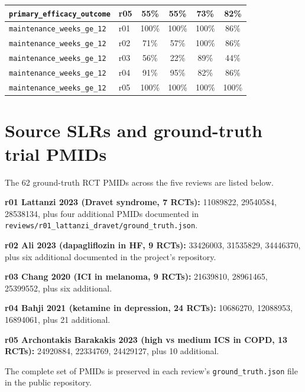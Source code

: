 \documentclass[a4paper,fleqn]{cas-sc}
\begin{document}
\begin{table}[ht]
\begin{tabular*}{\tblwidth}{@{}p{3.6cm}p{0.6cm}cccc@{}}
\texttt{primary\_efficacy\_outcome} & r05 & 55\% & 55\% & 73\% & 82\% \\
\midrule
\texttt{maintenance\_weeks\_ge\_12} & r01 & 100\% & 100\% & 100\% & 86\% \\
\texttt{maintenance\_weeks\_ge\_12} & r02 & 71\% & 57\% & 100\% & 86\% \\
\texttt{maintenance\_weeks\_ge\_12} & r03 & 56\% & 22\% & 89\% & 44\% \\
\texttt{maintenance\_weeks\_ge\_12} & r04 & 91\% & 95\% & 82\% & 86\% \\
\texttt{maintenance\_weeks\_ge\_12} & r05 & 100\% & 100\% & 100\% & 100\% \\
\bottomrule
\end{tabular*}
\end{table}

\section{Source SLRs and ground-truth trial PMIDs}\label{app:pmids}

The 62 ground-truth RCT PMIDs across the five reviews are listed below.

\textbf{r01 Lattanzi 2023 (Dravet syndrome, 7 RCTs):} 11089822, 29540584,
28538134, plus four additional PMIDs documented in
\texttt{reviews/r01\_lattanzi\_dravet/ground\_truth.json}.

\textbf{r02 Ali 2023 (dapagliflozin in HF, 9 RCTs):} 33426003, 31535829,
34446370, plus six additional documented in the project's repository.

\textbf{r03 Chang 2020 (ICI in melanoma, 9 RCTs):} 21639810, 28961465,
25399552, plus six additional.

\textbf{r04 Bahji 2021 (ketamine in depression, 24 RCTs):} 10686270,
12088953, 16894061, plus 21 additional.

\textbf{r05 Archontakis Barakakis 2023 (high vs medium ICS in COPD, 13 RCTs):}
24920884, 22334769, 24429127, plus 10 additional.

The complete set of PMIDs is preserved in each review's
\texttt{ground\_truth.json} file in the public repository.
\end{document}
